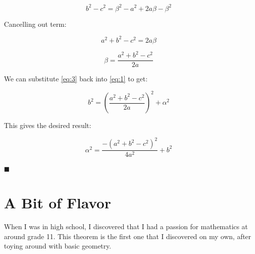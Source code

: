 \documentclass{article}
\begin{document}
	$$ b^2 - c^2 = \beta^2 - a^2 + 2 a \beta - \beta^2 $$
	
	Cancelling out term:
	
	$$ a^2 + b^2 - c^2 = 2 a \beta $$
	
	\begin{equation}
	\beta = \frac{ a^2 + b^2 - c^2 }{ 2 a } \label{eq:3}
	\end{equation}
	
	We can substitute \ref{eq:3} back into \ref{eq:1} to get:
	
	$$ b^2 = \left( \frac{ a^2 + b^2 - c^2 }{ 2 a } \right)^2 + \alpha^2 $$
	
	This gives the desired result:
	
	\begin{equation}
	\alpha^2 = \frac{ -( a^2 + b^2 - c^2 )^2 }{4 a^2} + b^2
	\end{equation}
	
	\raggedleft
	$ \blacksquare $
	
	\raggedright
	
	
	\section{A Bit of Flavor}
	
	When I was in high school, I discovered that I had a passion for mathematics at around grade 11.
	This theorem is the first one that I discovered on my own, after toying around with basic geometry. 
	
\end{document}

